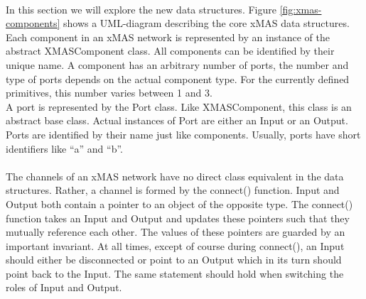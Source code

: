 \documentclass[a4paper,11pt]{article}
\begin{document}
\paragraph{}
In this section we will explore the new data structures. Figure \ref{fig:xmas-components} shows a
UML-diagram describing the core xMAS data structures. Each component in an xMAS network is represented
by an instance of the abstract XMASComponent class. All components can be identified by their unique name.
A component has an arbitrary number of ports, the number and type of ports depends on the actual
component type. For the currently defined primitives, this number varies between 1 and 3.\\
A port is represented by the Port class. Like XMASComponent, this class is an abstract base class. Actual instances
of Port are either an Input or an Output. Ports are identified by their name just like components.
Usually, ports have short identifiers like ``a'' and ``b''. 
\paragraph{}
The channels of an xMAS network have no direct class equivalent in the data structures. Rather, a channel is
formed by the connect() function. Input and Output both contain a pointer to an object of the opposite type.
The connect() function takes an Input and Output and updates these pointers such that they mutually
reference each other. The values of these pointers are guarded by an important invariant. At all times, 
except of course during connect(), an Input should either be disconnected or point to an Output which
in its turn should point back to the Input. The same statement should hold when switching the roles of
Input and Output.
\end{document}
